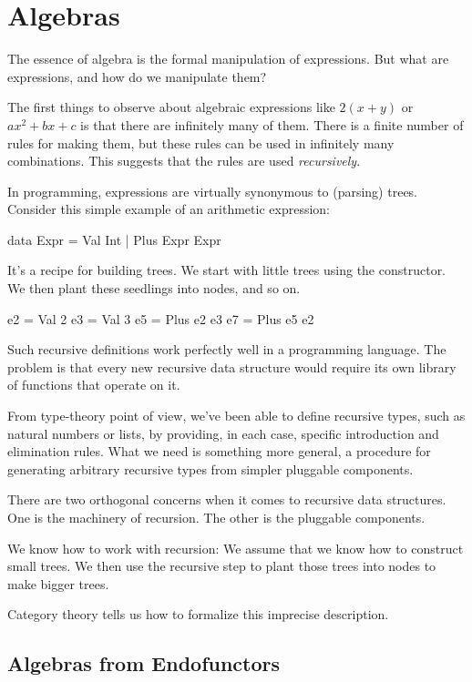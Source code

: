\documentclass[DaoFP]{subfiles}
\begin{document}
\setcounter{chapter}{10}

\chapter{Algebras}

The essence of algebra is the formal manipulation of expressions. But what are expressions, and how do we manipulate them?

The first things to observe about algebraic expressions like $2 (x + y)$ or $a x^2 + b x + c$ is that there are infinitely many of them. There is a finite number of rules for making them, but these rules can be used in infinitely many combinations. This suggests that the rules are used \emph{recursively}. 


In programming, expressions are virtually synonymous to (parsing) trees. Consider this simple example of an arithmetic expression:
\begin{haskell}
data Expr = Val Int 
          | Plus Expr Expr
\end{haskell}
It's a recipe for building trees. We start with little trees using the  constructor. We then plant these seedlings into nodes, and so on.
\begin{haskell}
e2 = Val 2
e3 = Val 3
e5 = Plus e2 e3
e7 = Plus e5 e2
\end{haskell}

Such recursive definitions work perfectly well in a programming language. The problem is that every new recursive data structure would require its own library of functions that operate on it.

From type-theory point of view, we've been able to define recursive types, such as natural numbers or lists, by providing, in each case, specific introduction and elimination rules. What we need is something more general, a procedure for generating arbitrary recursive types from simpler pluggable components. 

There are two orthogonal concerns when it comes to recursive data structures. One is the machinery of recursion. The other is the pluggable components. 

We know how to work with recursion: We assume that we know how to construct small trees. We then use the recursive step to plant those trees into nodes to make bigger trees. 

Category theory tells us how to formalize this imprecise description.

\section{Algebras from Endofunctors}
\end{document}

